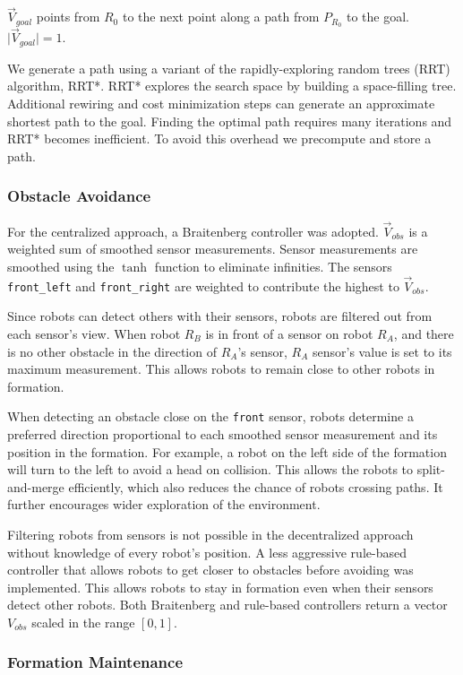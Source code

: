 \documentclass[letterpaper, 10 pt, conference]{ieeeconf}  %
\begin{document}
$\vec{V}_{goal}$ points from $R_0$ to the next point along a path from $P_{R_0}$ to the goal. $\vert\vec{V}_{goal}\rvert = 1$.

We generate a path using a variant of the rapidly-exploring random trees (RRT) algorithm, RRT*. RRT* explores the search space by building a space-filling tree. Additional rewiring and cost minimization steps can generate an approximate shortest path to the goal. Finding the optimal path requires many iterations and RRT* becomes inefficient. To avoid this overhead we precompute and store a path.

\subsubsection*{Obstacle Avoidance}

For the centralized approach, a Braitenberg controller was adopted. $\vec{V}_{obs}$ is a weighted sum of smoothed sensor measurements. Sensor measurements are smoothed using the $\tanh$ function to eliminate infinities. The sensors \texttt{front\_left} and \texttt{front\_right} are weighted to contribute the highest to $\vec{V}_{obs}$. 

Since robots can detect others with their sensors, robots are filtered out from each sensor's view. When robot $R_B$ is in front of a sensor on robot $R_A$, and there is no other obstacle in the direction of $R_A$'s sensor, $R_A$ sensor's value is set to its maximum measurement. This allows robots to remain close to other robots in formation.

When detecting an obstacle close on the \texttt{front} sensor, robots determine a preferred direction proportional to each smoothed sensor measurement and its position in the formation. For example, a robot on the left side of the formation will turn to the left to avoid a head on collision. This allows the robots to split-and-merge efficiently, which also reduces the chance of robots crossing paths. It further encourages wider exploration of the environment.

Filtering robots from sensors is not possible in the decentralized approach without knowledge of every robot's position. A less aggressive rule-based controller that allows robots to get closer to obstacles before avoiding was implemented. This allows robots to stay in formation even when their sensors detect other robots. Both Braitenberg and rule-based controllers return a vector $V_{obs}$ scaled in the range $[0,1]$.

\subsubsection*{Formation Maintenance}
\end{document}
